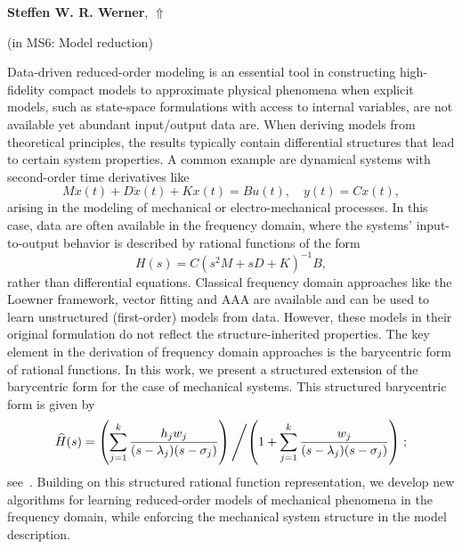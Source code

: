 \documentclass[ILAS2025-program.tex]{subfiles}
\begin{document}
     \hypertarget{down0130}{}\begin{ilasabstract}
    
    \textbf{Steffen W. R. Werner},  \hfill \hyperlink{up0130}{$\Uparrow$}
    
    (in {\color{mstitle}MS6: Model reduction})
        
        \mtskip
    \begin{bibunit}
        Data-driven reduced-order modeling is an essential tool in constructing
high-fidelity compact models to approximate physical phenomena when explicit
models, such as state-space formulations with access to internal variables, are
not available yet abundant input/output data are.
When deriving models from theoretical principles, the results
typically contain differential structures that lead to certain system
properties.
A common example are dynamical systems with second-order time derivatives
like
\begin{equation*}
  M \ddot{x}(t) + D \dot{x}(t) + K x(t) = B u(t), \quad
  y(t) = C x(t),
\end{equation*}
arising in the modeling of mechanical or electro-mechanical processes.
In this case, data are often available in the frequency domain, where the
systems' input-to-output behavior is described by rational functions
of the form
\begin{equation*}
  H(s) = C (s^{2} M + s D + K)^{-1} B,
\end{equation*}
rather than differential equations.
Classical frequency domain approaches like the Loewner framework, vector
fitting and AAA are available and can be used to learn unstructured
(first-order) models from data.
However, these models in their original formulation do not reflect the
structure-inherited properties.
The key element in the derivation of frequency domain approaches is the
barycentric form of rational functions.
In this work, we present a structured extension of the barycentric form for the
case of mechanical systems.
This structured barycentric form is given by
\begin{equation*}
  \widehat{H}(s) = \left(\sum_{j = 1}^k\frac{h_{j} w_{j}}{(s - \lambda_{j})
    (s - \sigma_{j})} \right) \left/ \left(1 + \sum_{j = 1}^{k}
    \frac{w_{j}}{(s - \lambda_{j})(s - \sigma_{j})}\right)\right.;
\end{equation*}
see~\cite{WernerSWR_GosGW24}.
Building on this structured rational function representation, we develop new
algorithms for learning reduced-order models of mechanical phenomena in the
frequency domain, while enforcing the mechanical system structure in the model
description.


\end{bibunit}
\end{ilasabstract}
\end{document}
